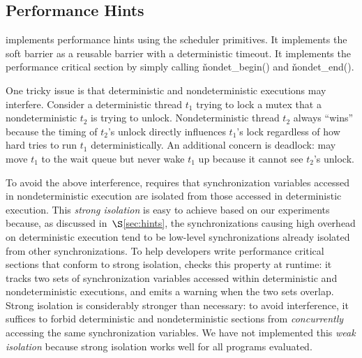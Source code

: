 \subsection{Performance Hints} \label{sec:hints-impl}



\xxx implements performance hints using the scheduler primitives.  It
implements the soft barrier as a reusable barrier with a deterministic
timeout.  It implements the performance critical section by simply calling
\v{nondet\_begin()} and \v{nondet\_end()}.

One tricky issue is that deterministic and nondeterministic executions may
interfere.  Consider a deterministic thread $t_1$ trying to lock a mutex
that a nondeterministic $t_2$ is trying to unlock.
Nondeterministic thread $t_2$ always ``wins'' because the timing of
$t_2$'s unlock directly influences $t_1$'s lock regardless of how hard
\xxx tries to run $t_1$ deterministically.  An additional concern is
deadlock: \xxx may move $t_1$ to the wait queue but never wake $t_1$ up
because it cannot see  $t_2$'s unlock.

To avoid the above interference, \xxx requires that synchronization variables accessed
in nondeterministic execution are isolated from those accessed in
deterministic execution.  This \emph{strong isolation} is easy to achieve based
on our experiments because, as discussed in~$\S$\ref{sec:hints}, the
synchronizations causing high overhead on deterministic execution tend to
be low-level synchronizations already isolated from other
synchronizations. To help developers write performance critical sections
that conform to strong isolation, \xxx checks this property at runtime:
it tracks two sets of synchronization variables accessed within
deterministic and nondeterministic executions, and emits a warning when the
two sets overlap.  Strong isolation is considerably stronger than
necessary: to avoid interference, it suffices to forbid
deterministic and nondeterministic sections from \emph{concurrently}
accessing the same synchronization variables.  We have not implemented
this \emph{weak isolation} because strong isolation works well for all
programs evaluated.

